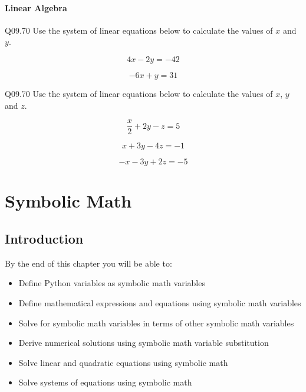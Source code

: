 \documentclass{book}
\begin{document}
    
        \subsubsection{Linear Algebra}\label{linear-algebra}
    




    
        Q09.70 Use the system of linear equations below to calculate the values
of \(x\) and \(y\).

\[ 4x - 2y = -42 \]

\[ -6x + y = 31 \]

Q09.70 Use the system of linear equations below to calculate the values
of \(x\), \(y\) and \(z\).

\[ \frac{x}{2} +2y - z = 5 \]

\[ x + 3y - 4z = -1 \]

\[ -x - 3y + 2z = -5 \]
    




    
        \chapter{Symbolic Math}\label{symbolic-math}
    




    
        \section{Introduction}\label{introduction}
    




    
        By the end of this chapter you will be able to:

\begin{itemize}
\item
  Define Python variables as symbolic math variables
\item
  Define mathematical expressions and equations using symbolic math
  variables
\item
  Solve for symbolic math variables in terms of other symbolic math
  variables
\item
  Derive numerical solutions using symbolic math variable substitution
\item
  Solve linear and quadratic equations using symbolic math
\item
  Solve systems of equations using symbolic math
\end{itemize}
        \newpage
\end{document}
